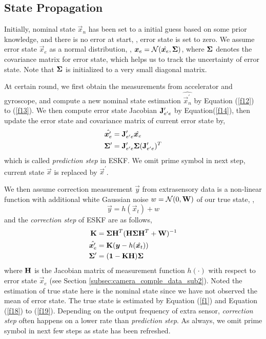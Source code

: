 \subsection{State Propagation}
\label{subsec:ESKF_IMU_sub4}

Initially, nominal state $\vec{x}_n$ has been set to a initial guess based on some prior knowledge, and there is no error at start, \ie, error state is set to zero. We assume error state $\vec{x}_e$ as a normal distribution, \ie, $\boldsymbol{x}_e = \mathcal{N}(\hat{\boldsymbol{x}_e}, \mathbf{\Sigma})$, where $\mathbf{\Sigma}$ denotes the covariance matrix for error state, which helps us to track the uncertainty of error state. Note that $\mathbf{\Sigma}$ is initialized to a very small diagonal matrix.

At certain round, we first obtain the measurements from accelerator and gyroscope, and compute a new nominal state estimation $\hat{\vec{x}_n^\prime}$ by Equation (\ref{f12}) to (\ref{f13}). We then compute error state Jacobian $\mathbf{J}_{e^\prime e}^\prime$ by Equation(\ref{f14}), then update the error state and covariance matrix of current error state by,
\begin{align} \label{f22}
\hat{\boldsymbol{x}_e^\prime} &= \mathbf{J}_{e^\prime e}^\prime\hat{\boldsymbol{x}_e} \\
\mathbf{\Sigma}^\prime &= \mathbf{J}_{e^\prime e}^\prime \mathbf{\Sigma} (\mathbf{J}_{e^\prime e}^\prime)^T
\end{align}
which is called \textit{prediction step} in ESKF. We omit prime symbol in next step, \ie current state $\vec{x}$ is replaced by $\vec{x}^\prime$.

We then assume correction measurement $\vec{y}$ from extrasensory data is a non-linear function with additional white Gaussian noise $w = \mathcal{N}(0, \mathbf{W})$ of our true state, \ie,
\begin{equation}\label{f17}
	\vec{y} = h(\vec{x}_t) + w
\end{equation}
and the \textit{correction step} of ESKF are as follows,
\begin{align}\label{f30}
	\mathbf{K} &= \mathbf{\Sigma}\mathbf{H}^T(\mathbf{H}\mathbf{\Sigma}\mathbf{H}^T+\mathbf{W})^{-1} \\
	\hat{\boldsymbol{x}_e^\prime} &= \mathbf{K} (\boldsymbol{y} - h(\hat{\boldsymbol{x}_t})) \\
	\mathbf{\Sigma}^\prime &= (\mathbf{1} - \mathbf{K}\mathbf{H})\mathbf{\Sigma}
\end{align}
where $\mathbf{H}$ is the Jacobian matrix of measurement function $h(\cdot)$ with respect to error state $\vec{x}_e$ (see Section \ref{subsec:camera_comple_data_sub2}). Noted the estimation of true state here is the nominal state since we have not observed the mean of error state. The true state is estimated by Equation (\ref{f1}) and Equation (\ref{f18}) to (\ref{f19}). Depending on the output frequency of extra sensor, \textit{correction step} often happens on a lower rate than \textit{prediction step}. As always, we omit prime symbol in next few steps as state has been refreshed.  


